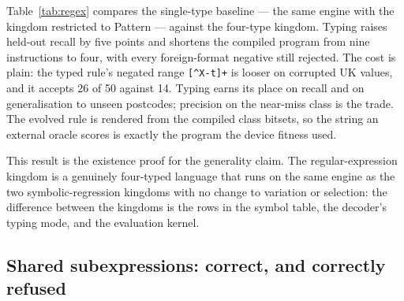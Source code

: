 \documentclass[sigconf,nonacm]{acmart}
\newcommand{\rx}[1]{\lstinline[style=mono]!#1!}
\newcommand{\ty}[1]{\textsf{#1}}
\begin{document}
Table~\ref{tab:regex} compares the single-type baseline --- the same engine with
the kingdom restricted to \ty{Pattern} --- against the four-type kingdom. Typing
raises held-out recall by five points and shortens the compiled program from
nine instructions to four, with every foreign-format negative still rejected. The cost is plain:
the typed rule's negated range \rx{[^X-t]+} is looser on corrupted UK values,
and it accepts 26 of 50 against 14. Typing earns its place on recall and on
generalisation to unseen postcodes; precision on the near-miss class is the
trade. The evolved rule is rendered from the compiled class bitsets, so the
string an external oracle scores is exactly the program the device fitness used.

\begin{table}[t]
\caption{UK-postcode detector, held-out set, one seed, 180~s. ``Accepted''
counts negatives the rule wrongly accepted (false positives).}
\label{tab:regex}
\small
{}
\end{table}

This result is the existence proof for the generality claim. The
regular-expression kingdom is a genuinely four-typed language that runs on the
same engine as the two symbolic-regression kingdoms with no change to variation
or selection: the difference between the kingdoms is the rows in the symbol
table, the decoder's typing mode, and the evaluation kernel.

\subsection{Shared subexpressions: correct, and correctly refused}
\label{sec:results-share}
\end{document}
